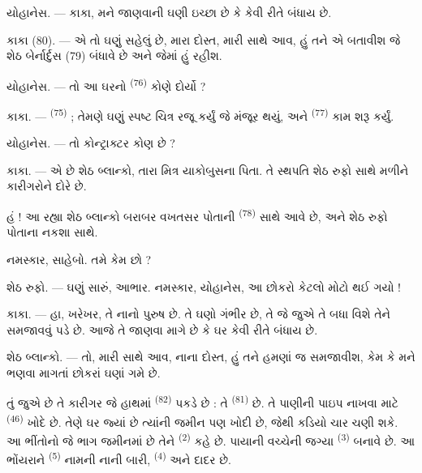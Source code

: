 \VUsaut{6.0mm}
\VUsaut{1.4mm}
\VUsaut{2.2mm}

\VUsaut{3.0mm}

\textsc{યોહાનેસ}. --- કાકા, મને જાણવાની ઘણી ઇચ્છા છે કે 
કેવી રીતે બંધાય છે.

\textsc{કાકા} (80). --- એ તો ઘણું સહેલું છે, મારા દોસ્ત, મારી સાથે આવ,
હું તને એ બતાવીશ જે શેઠ બેર્નાર્દુસ (79) બંધાવે છે અને જેમાં હું
રહીશ.

\textsc{યોહાનેસ}. --- તો આ ઘરનો  \textsuperscript{(76)}
કોણે દોર્યો ?

\textsc{કાકા}. ---  \textsuperscript{(75)} ; તેમણે ઘણું
સ્પષ્ટ ચિત્ર રજૂ કર્યું જે મંજૂર થયું, અને 
\textsuperscript{(77)} કામ શરૂ કર્યું.

\textsc{યોહાનેસ}. --- તો કોન્ટ્રાક્ટર કોણ છે ?

\textsc{કાકા}. --- એ છે શેઠ બ્લાન્કો, તારા મિત્ર યાકોબુસના પિતા. તે
સ્થપતિ શેઠ રુફો સાથે મળીને કારીગરોને દોરે છે.

હં ! આ રહ્યા શેઠ બ્લાન્કો બરાબર વખતસર પોતાની 
\textsuperscript{(78)} સાથે આવે છે, અને શેઠ રુફો પોતાના નકશા સાથે.

નમસ્કાર, સાહેબો. તમે કેમ છો ?

\textsc{શેઠ રુફો}. --- ઘણું સારું, આભાર. નમસ્કાર, યોહાનેસ, આ છોકરો
કેટલો મોટો થઈ ગયો !

\textsc{કાકા}. --- હા, ખરેખર, તે નાનો પુરુષ છે. તે ઘણો ગંભીર છે, તે જે
જુએ તે બધા વિશે તેને સમજાવવું પડે છે. આજે તે જાણવા માગે છે કે ઘર કેવી
રીતે બંધાય છે.

\VUsaut{3.0mm}

\textsc{શેઠ બ્લાન્કો}. --- તો, મારી સાથે આવ, નાના દોસ્ત, હું તને
હમણાં જ સમજાવીશ, કેમ કે મને ભણવા માગતાં છોકરાં ઘણાં ગમે છે.

તું જુએ છે તે કારીગર જે હાથમાં  \textsuperscript{(82)}
પકડે છે : તે  \textsuperscript{(81)} છે. તે પાણીની
પાઇપ નાખવા માટે  \textsuperscript{(46)} ખોદે છે. તેણે ઘર
જ્યાં છે ત્યાંની જમીન પણ ખોદી છે, જેથી કડિયો ચાર  ચણી
શકે. આ ભીંતોનો જે ભાગ જમીનમાં છે તેને 
\textsuperscript{(2)} કહે છે. પાયાની વચ્ચેની જગ્યા 
\textsuperscript{(3)} બનાવે છે. આ ભોંયરાને 
\textsuperscript{(5)} નામની નાની બારી, 
\textsuperscript{(4)} અને દાદર છે.

